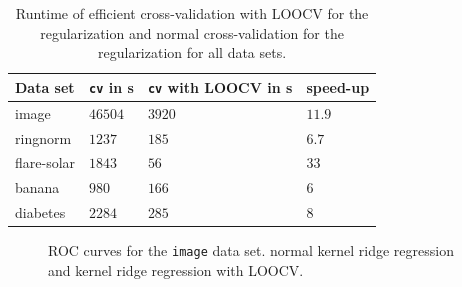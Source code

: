 \documentclass[a4paper, 11pt, titlepage]{article}
\begin{document}
\begin{table}
	\centering
	\begin{tabular}{llll}
	Data set & \texttt{cv} in s & \texttt{cv} with LOOCV in s & speed-up\\
	\hline
	image & $46504$ & $3920$ & $11.9$\\
	ringnorm & $1237$ & $185$ & $6.7$\\
	flare-solar & $1843$ & $56$ & $33$ \\
	banana & $980$ & $166$ & $6$\\
	diabetes & $2284$ & $285$ & $8$
	\end{tabular}
	\caption{Runtime of efficient cross-validation with LOOCV for the regularization and normal cross-validation for the regularization for all data sets.}
	\label{tab:runtime}
\end{table}	

\begin{figure}
	\centering
	\caption{ROC curves for the \texttt{image} data set. \protect{} normal kernel ridge regression and \protect{} kernel ridge regression with LOOCV.}
	\label{fig:image}
\end{figure}
\end{document}
